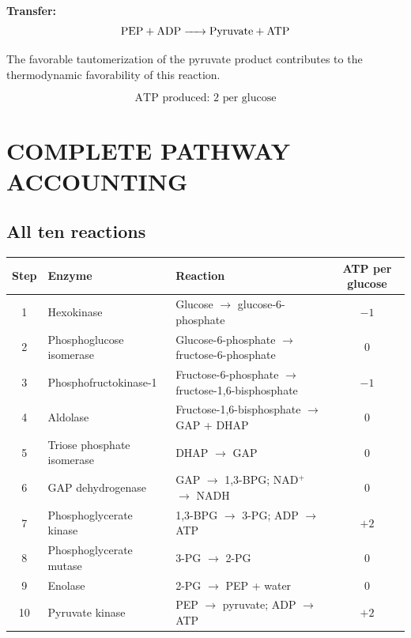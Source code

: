 \documentclass[10pt,a4paper,landscape]{article}
\begin{document}
\textcolor{phos}{\textbf{Transfer:}}
\[
\ce{PEP + ADP -> Pyruvate + ATP}
\]

The favorable tautomerization of the pyruvate product contributes
to the thermodynamic favorability of this reaction.

\[
\boxed{\text{ATP produced: 2 per glucose}}
\]

\newpage
\section*{COMPLETE PATHWAY ACCOUNTING}

\subsection*{All ten reactions}

\small

\begin{tabular}{c p{5.1cm} p{8.0cm} c}
\toprule
\textbf{Step} & \textbf{Enzyme} & \textbf{Reaction} &
\textbf{ATP per glucose}\\
\midrule
1 & Hexokinase &
Glucose $\rightarrow$ glucose-6-phosphate & $-1$\\

2 & Phosphoglucose isomerase &
Glucose-6-phosphate $\rightarrow$ fructose-6-phosphate & 0\\

3 & Phosphofructokinase-1 &
Fructose-6-phosphate $\rightarrow$ fructose-1,6-bisphosphate & $-1$\\

4 & Aldolase &
Fructose-1,6-bisphosphate $\rightarrow$ GAP + DHAP & 0\\

5 & Triose phosphate isomerase &
DHAP $\rightarrow$ GAP & 0\\

6 & GAP dehydrogenase &
GAP $\rightarrow$ 1,3-BPG; NAD$^+$ $\rightarrow$ NADH & 0\\

7 & Phosphoglycerate kinase &
1,3-BPG $\rightarrow$ 3-PG; ADP $\rightarrow$ ATP & $+2$\\

8 & Phosphoglycerate mutase &
3-PG $\rightarrow$ 2-PG & 0\\

9 & Enolase &
2-PG $\rightarrow$ PEP + water & 0\\

10 & Pyruvate kinase &
PEP $\rightarrow$ pyruvate; ADP $\rightarrow$ ATP & $+2$\\

\bottomrule
\end{tabular}
\end{document}
